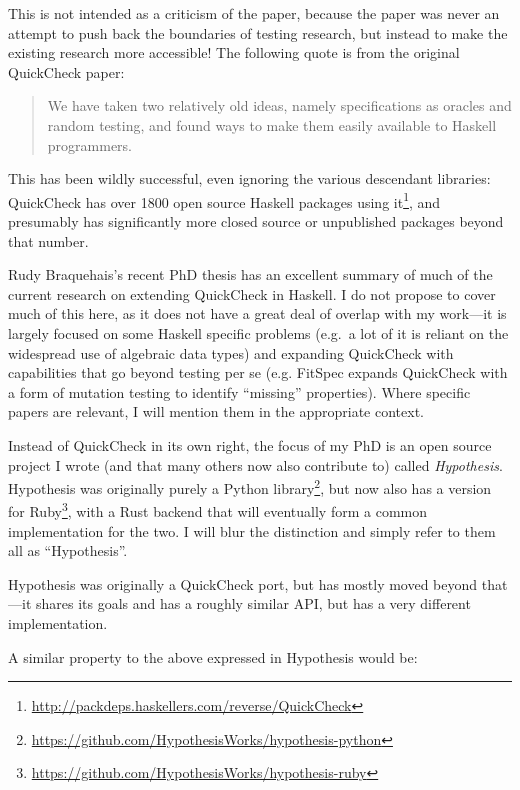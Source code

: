 This is not intended as a criticism of the paper,
because the paper was never an attempt to push back the boundaries of testing research,
but instead to make the existing research more accessible!
The following quote is from the original QuickCheck paper\cite{DBLP:conf/icfp/ClaessenH00}:

\begin{quote}
We have taken two relatively old ideas, namely specifications
as oracles and random testing, and found ways to make
them easily available to Haskell programmers.
\end{quote}

This has been wildly successful,
even ignoring the various descendant libraries:
QuickCheck has over 1800 open source Haskell packages using it\footnote{\url{http://packdeps.haskellers.com/reverse/QuickCheck}},
and presumably has significantly more closed source or unpublished packages beyond that number.

Rudy Braquehais's recent PhD thesis\cite{matela2017tools} has an excellent summary of much of the current research on extending QuickCheck in Haskell.
I do not propose to cover much of this here,
as it does not have a great deal of overlap with my work---it
is largely focused on some Haskell specific problems (e.g.\ a lot of it is reliant on the widespread use of algebraic data types) and expanding QuickCheck with capabilities that go beyond testing per se
(e.g. FitSpec\cite{DBLP:conf/haskell/BraquehaisR16} expands QuickCheck with a form of mutation testing\cite{DBLP:journals/tse/JiaH11} to identify ``missing'' properties).
Where specific papers are relevant,
I will mention them in the appropriate context.

Instead of QuickCheck in its own right,
the focus of my PhD is an open source project I wrote (and that many others now also contribute to) called \emph{Hypothesis}.
Hypothesis was originally purely a Python library\footnote{\url{https://github.com/HypothesisWorks/hypothesis-python}},
but now also has a version for Ruby\footnote{\url{https://github.com/HypothesisWorks/hypothesis-ruby}},
with a Rust backend that will eventually form a common implementation for the two.
I will blur the distinction and simply refer to them all as ``Hypothesis''.

Hypothesis was originally a QuickCheck port,
but has mostly moved beyond that---it
shares its goals and has a roughly similar API,
but has a very different implementation.

A similar property to the above expressed in Hypothesis would be:

